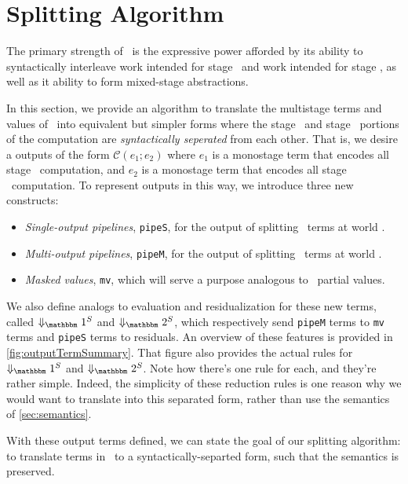 
\section{Splitting Algorithm}
\label{sec:splitting}

\begin{abstrsyn}

The primary strength of \lang\ is the expressive power afforded by
its ability to syntactically interleave work intended for stage \bbone\
and work intended for stage \bbtwo, as well as it ability to form
mixed-stage abstractions. 

In this section, we provide an algorithm to translate the multistage terms and values of \lang\
into equivalent but simpler forms where the stage \bbone\ and stage \bbtwo\ portions 
of the computation are {\em syntactically seperated} from each other.
That is, we desire a outputs of the form $\mathcal{C}(e_1;e_2)$ where  
$e_1$ is a monostage term that encodes all stage \bbone\ computation, 
and $e_2$ is a monostage term that encodes all stage \bbtwo\ computation.
To represent outputs in this way, we introduce three new constructs:
\begin{itemize}
\item {\em Single-output pipelines}, \texttt{pipeS}, for the output of splitting \lang\ terms at world \bbtwo.
\item {\em Multi-output pipelines}, \texttt{pipeM}, for the output of splitting \lang\ terms at world \bbonem. 
\item {\em Masked values}, \texttt{mv}, which will serve a purpose analogous to \lang\ partial values.
\end{itemize}

We also define analogs to evaluation and residualization for these new terms, 
called $\sepredonesym$ and $\sepredtwosym$, 
which respectively send \texttt{pipeM} terms to \texttt{mv} terms
and \texttt{pipeS} terms to residuals.
An overview of these features is provided in \ref{fig:outputTermSummary}.
That figure also provides the actual rules for $\sepredonesym$ and $\sepredtwosym$.
Note how there's one rule for each, and they're rather simple.
Indeed, the simplicity of these reduction rules is one reason why we 
would want to translate into this separated form, rather than use the semantics of \ref{sec:semantics}.

With these output terms defined, we can state the goal of our splitting algorithm:
to translate terms in \lang\ to a syntactically-separted form, 
such that the semantics is preserved.


\end{abstrsyn}
